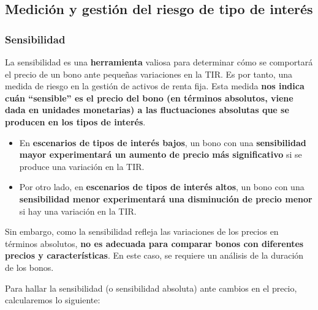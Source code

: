 \documentclass[
  letterpaper,
  DIV=11,
  numbers=noendperiod]{scrreprt}
\begin{document}
\begin{tcolorbox}
\subsection{Medición y gestión del riesgo de tipo de
interés}\label{mediciuxf3n-y-gestiuxf3n-del-riesgo-de-tipo-de-interuxe9s}

\subsubsection{Sensibilidad}\label{sensibilidad}

La sensibilidad es una \textbf{herramienta} valiosa para determinar cómo
se comportará el precio de un bono ante pequeñas variaciones en la TIR.
Es por tanto, una medida de riesgo en la gestión de activos de renta
fija. Esta medida \textbf{nos indica cuán ``sensible'' es el precio del
bono (en términos absolutos, viene dada en unidades monetarias) a las
fluctuaciones absolutas que se producen en los tipos de interés}.

\begin{itemize}
\item
  En \textbf{escenarios de tipos de interés bajos}, un bono con una
  \textbf{sensibilidad mayor experimentará un aumento de precio más
  significativo} si se produce una variación en la TIR.
\item
  Por otro lado, en \textbf{escenarios de tipos de interés altos}, un
  bono con una \textbf{sensibilidad menor experimentará una disminución
  de precio menor} si hay una variación en la TIR.
\end{itemize}

Sin embargo, como la sensibilidad refleja las variaciones de los precios
en términos absolutos, \textbf{no es adecuada para comparar bonos con
diferentes precios y características}. En este caso, se requiere un
análisis de la duración de los bonos.

Para hallar la sensibilidad (o sensibilidad absoluta) ante cambios en el
precio, calcularemos lo siguiente:

\begin{tcolorbox}[enhanced jigsaw, toprule=.15mm, left=2mm, arc=.35mm, breakable, bottomrule=.15mm, opacityback=0, rightrule=.15mm, leftrule=.75mm, colframe=quarto-callout-note-color-frame, colback=white]
\begin{minipage}[t]{5.5mm}
\textcolor{quarto-callout-note-color}{\faInfo}
\end{minipage}%
\begin{minipage}[t]{\textwidth - 5.5mm}


\end{minipage}
\end{tcolorbox}
\end{tcolorbox}
\end{document}
